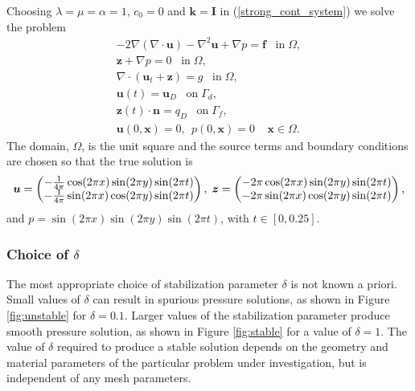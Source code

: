 Choosing $\lambda = \mu =  \alpha = 1$, $c_0 = 0$ and $\mathbf{k}=\mathbf{I}$ in (\ref{strong_cont_system}) we solve the problem
\begin{subequations}
\begin{align}
-2 \nabla \left( \nabla \cdot \mathbf{u} \right) - \nabla^{2} \mathbf{u} + \nabla p = \mathbf{f} \;\;\; \mbox{in}\; \Omega,\\
{\mathbf{z}} + \nabla p =  0 \;\;\; \mbox{in}\; \Omega,\\
\nabla \cdot (\mathbf{u}_{t} + \mathbf{z} )  = g   \;\;\; \mbox{in}\; \Omega,\\
\mathbf{u}(t) =\mathbf{u}_{D}   \;\;\; \mbox{on}\; \Gamma_{d}, \\
\mathbf{z}(t) \cdot \mathbf{n} = {q_{D}}   \;\;\; \mbox{on}\; \Gamma_{f}, \\
\mathbf{u}(0,\mathbf{x}) = 0, ~~
p(0,\mathbf{x}) = 0 \;\;\;\; \mathbf{x} \in  \Omega.
\end{align}
\label{eqn:simplified_system}
\end{subequations}
The domain, $\Omega$, is the unit square and the source terms and boundary conditions are chosen so that the true solution is  
\begin{equation*}
 \boldsymbol{u} = \begin{pmatrix}
 -\frac{1}{4 \pi}\cos(2\pi x)\sin(2\pi y)\sin(2\pi t)  \\
 -\frac{1}{4 \pi}\sin(2\pi x)\cos(2\pi y)\sin(2\pi t)
 \end{pmatrix},
\;
 \boldsymbol{z} =\begin{pmatrix}
 -2\pi\cos(2\pi x)\sin(2\pi y)\sin(2\pi t)  \\
 -2\pi\sin(2\pi x)\cos(2\pi y)\sin(2\pi t)
 \end{pmatrix},
\end{equation*}
and  $p=\sin(2\pi x)\sin(2\pi y)\sin(2\pi t)$, with $t\in[0,0.25]$.


\subsubsection{Choice of $\delta$}
The most appropriate choice of stabilization parameter $\delta$ is not known a priori. Small values of $\delta$ can result in spurious pressure solutions, as shown in Figure \ref{fig:unstable} for $\delta=0.1$. Larger values of the stabilization parameter produce smooth pressure solution, as shown in Figure \ref{fig:stable} for a value of $\delta=1$. The value of $\delta$ required to produce a stable solution depends on the geometry and material parameters of the particular problem under investigation, but is independent of any mesh parameters.

